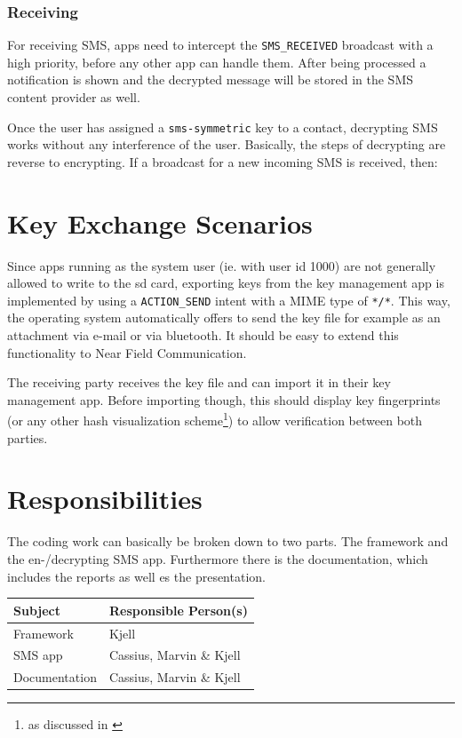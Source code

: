 \documentclass[a4paper,bibtotoc,draft]{scrartcl}
\begin{document}
		\subsubsection{Receiving}
      For receiving SMS, apps need to intercept the \texttt{SMS\_RECEIVED} broadcast with a high priority, before any other app can handle them. After being processed a notification is shown and the decrypted message will be stored in the SMS content provider as well.
      
      Once the user has assigned a \texttt{sms-symmetric} key to a contact, decrypting SMS works without any interference of the user. Basically, the steps of decrypting are reverse to encrypting. If a broadcast for a new incoming SMS is received, then:

			\begin{algorithmic}
				\ELSE
				\ENDIF
			\end{algorithmic}

\section{Key Exchange Scenarios}
	Since apps running as the system user (ie. with user id 1000) are not generally allowed to write to the sd card,
	exporting keys from the key management app is implemented by using a \texttt{ACTION\_SEND} intent with a MIME type
	of \texttt{*/*}. This way, the operating system automatically offers to send the key file for example as an attachment
	via e-mail or via bluetooth. It should be easy to extend this functionality to Near Field Communication.

	The receiving party receives the key file and can import it in their key management app. Before importing though,
	this should display key fingerprints (or any other hash visualization scheme\footnote{as discussed in \cite{perrig99}})
	to allow verification between both parties.
	
\section{Responsibilities}
	The coding work can basically be broken down to two parts. The framework and the en-/decrypting SMS app. Furthermore there is the documentation, which includes the reports as well es the presentation.\\
	\center
		\begin{tabular}{l|l}
		Subject & Responsible Person(s)\\
		\hline
		Framework & Kjell \\
		SMS app & Cassius, Marvin \& Kjell \\
		Documentation & Cassius, Marvin \& Kjell \\
		\end{tabular}
 	
\end{document}
